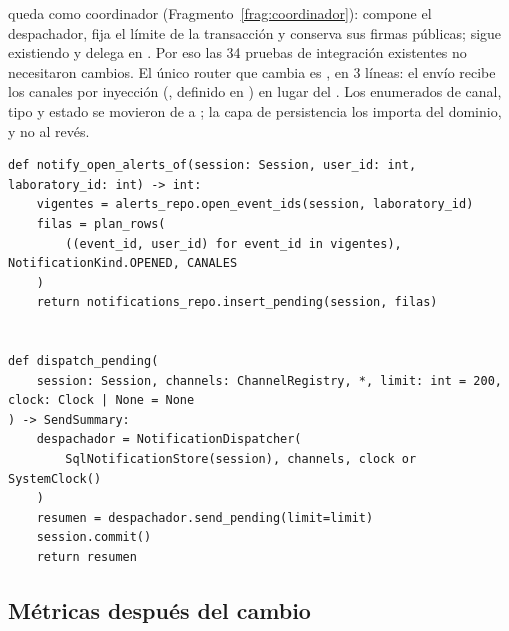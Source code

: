 \documentclass[11pt,a4paper]{article}
\begin{document}
 queda como coordinador (Fragmento~\ref{frag:coordinador}): compone el despachador, fija el límite de la transacción y conserva sus firmas públicas;  sigue existiendo y delega en . Por eso las 34 pruebas de integración existentes no necesitaron cambios. El único router que cambia es , en 3 líneas: el envío recibe los canales por inyección (, definido en ) en lugar del . Los enumerados de canal, tipo y estado se movieron de  a ; la capa de persistencia los importa del dominio, y no al revés.

\begin{lstlisting}[float=htbp,caption={\ev{E-07}. El servicio como coordinador (\cod{services/notification\_service.py}).},label=frag:coordinador]
def notify_open_alerts_of(session: Session, user_id: int, laboratory_id: int) -> int:
    vigentes = alerts_repo.open_event_ids(session, laboratory_id)
    filas = plan_rows(
        ((event_id, user_id) for event_id in vigentes), NotificationKind.OPENED, CANALES
    )
    return notifications_repo.insert_pending(session, filas)


def dispatch_pending(
    session: Session, channels: ChannelRegistry, *, limit: int = 200, clock: Clock | None = None
) -> SendSummary:
    despachador = NotificationDispatcher(
        SqlNotificationStore(session), channels, clock or SystemClock()
    )
    resumen = despachador.send_pending(limit=limit)
    session.commit()
    return resumen
\end{lstlisting}

\subsection{Métricas después del cambio}
\end{document}
